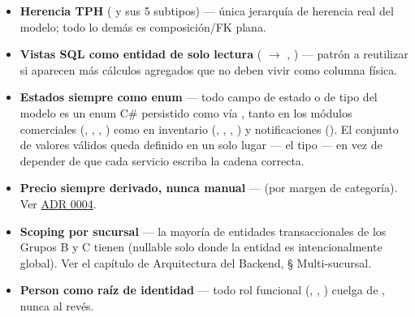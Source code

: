 \begin{itemize}
  \item \textbf{Herencia TPH} ( y sus 5 subtipos) --- única jerarquía de herencia real del modelo; todo lo demás es composición/FK plana.
  \item \textbf{Vistas SQL como entidad de solo lectura} ( $\to$ , ) --- patrón a reutilizar si aparecen más cálculos agregados que no deben vivir como columna física.
  \item \textbf{Estados siempre como enum} --- todo campo de estado o de tipo del modelo es un enum C\# persistido como  vía \allowbreak {}, tanto en los módulos comerciales (, , , ) como en inventario (, , \allowbreak {}, ) y notificaciones (\allowbreak {}). El conjunto de valores válidos queda definido en un solo lugar --- el tipo --- en vez de depender de que cada servicio escriba la cadena correcta.
  \item \textbf{Precio siempre derivado, nunca manual} --- \allowbreak {} (por margen de categoría). Ver \hyperref[adr:0004]{ADR 0004}.
  \item \textbf{Scoping por sucursal} --- la mayoría de entidades transaccionales de los Grupos B y C tienen  (nullable solo donde la entidad es intencionalmente global). Ver el capítulo de Arquitectura del Backend, § Multi-sucursal.
  \item \textbf{Person como raíz de identidad} --- todo rol funcional (, , ) cuelga de , nunca al revés.
\end{itemize}
